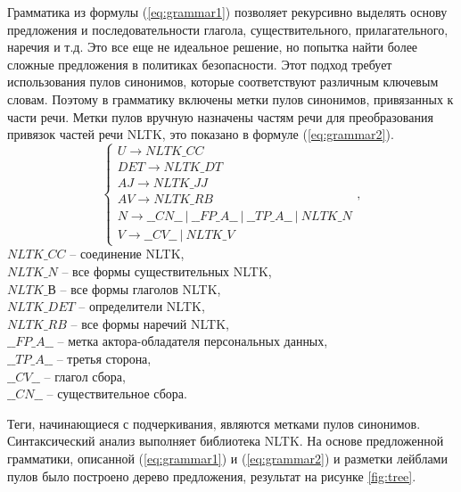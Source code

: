 \documentclass[../main]{subfiles}
\begin{document}
 Грамматика из формулы (\ref{eq:grammar1}) позволяет рекурсивно выделять основу предложения и последовательности глагола, существительного, прилагательного, наречия и т.д. Это все еще не идеальное решение, но попытка найти более сложные предложения в политиках безопасности. Этот подход требует использования пулов синонимов, которые соответствуют различным ключевым словам. Поэтому в грамматику включены метки пулов синонимов, привязанных к части речи. Метки пулов вручную назначены частям речи для преобразования привязок частей речи NLTK, это показано в формуле (\ref{eq:grammar2}).
\begin{equation}
    \label{eq:grammar2}
    \left\{ 
        \begin{array}{l}
            U \rightarrow NLTK\_CC \\
            DET \rightarrow NLTK\_DT \\
            AJ \rightarrow NLTK\_JJ \\
            AV \rightarrow NLTK\_RB \\
            N \rightarrow \_\_CN\_\_\ |\ \_\_FP\_A\_\_\ |\ \_\_TP\_A\_\_\ |\ NLTK\_N \\
            V \rightarrow \_\_CV\_\_\ |\ NLTK\_V
        \end{array},
    \right. 
\end{equation}
$NLTK\_CC$ -- соединение NLTK,\\
\makebox[12.5mm]{}$NLTK\_N$ -- все формы существительных NLTK,\\
\makebox[12.5mm]{}$NLTK\_В$ -- все формы глаголов NLTK,\\
\makebox[12.5mm]{}$NLTK\_DET$ -- определители NLTK,\\
\makebox[12.5mm]{}$NLTK\_RB$ -- все формы наречий NLTK,\\
\makebox[12.5mm]{}$\_\_FP\_A\_\_$ -- метка актора-обладателя персональных данных,\\
\makebox[12.5mm]{}$\_\_TP\_A\_\_$ -- третья сторона,\\
\makebox[12.5mm]{}$\_\_CV\_\_$ -- глагол сбора,\\
\makebox[12.5mm]{}$\_\_CN\_\_$ -- существительное сбора.

Теги, начинающиеся с подчеркивания, являются метками пулов синонимов. Синтаксический анализ выполняет библиотека NLTK. На основе предложенной грамматики, описанной (\ref{eq:grammar1}) и (\ref{eq:grammar2}) и разметки лейблами пулов было построено дерево предложения, результат на рисунке \ref{fig:tree}.
\end{document}
